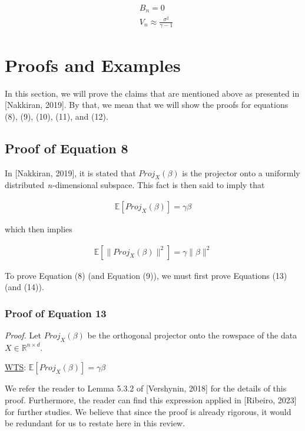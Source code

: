 \documentclass{article}
\begin{document}
\begin{align}
    &B_n = 0\\
    &V_n \approx \frac{\sigma^2}{\gamma - 1}
\end{align}



\section{Proofs and Examples}

In this section, we will prove the claims that are mentioned above as presented in [Nakkiran, 2019]. By that, we mean that we will show the proofs for equations (8), (9), (10), (11), and (12).

\subsection{Proof of Equation 8}

In [Nakkiran, 2019], it is stated that $Proj_X (\beta)$ is the projector onto a uniformly distributed $\emph{n}$-dimensional subspace. This fact is then said to imply that

\begin{align}
    \mathbb{E}[Proj_X (\beta)] = \gamma \beta
\end{align}

which then implies 

\begin{align}
    \mathbb{E} [\|Proj_X (\beta)\|^2] = \gamma \|\beta\|^2
\end{align}

To prove Equation (8) (and Equation (9)), we must first prove Equations (13) (and (14)).

\subsubsection{Proof of Equation 13}

\emph{Proof.}
Let $Proj_X (\beta)$ be the orthogonal projector onto the rowspace of the data $X\in \mathbb{R}^{n \times d}$.

\underline{WTS}: $\mathbb{E} [Proj_X (\beta)] = \gamma \beta$

We refer the reader to Lemma 5.3.2 of [Vershynin, 2018] for the details of this proof. Furthermore, the reader can find this expression applied in [Ribeiro, 2023] for further studies. We believe that since the proof is already rigorous, it would be redundant for us to restate here in this review. 
\end{document}
